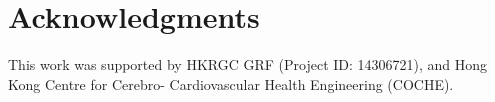 \section*{Acknowledgments}
This work was supported by HKRGC GRF (Project ID: 14306721), and Hong Kong Centre for Cerebro- Cardiovascular Health Engineering (COCHE).